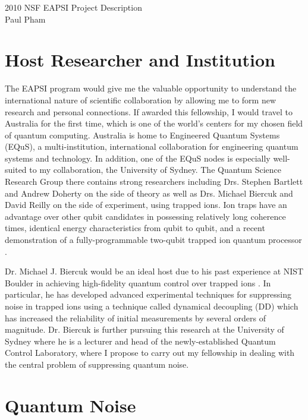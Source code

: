 \documentclass{article}
\begin{document}
\begin{center}
\LARGE{2010 NSF EAPSI Project Description}\\
\Large{Paul Pham}
\end{center}


\section{Host Researcher and Institution}

The EAPSI program would give me the valuable opportunity to understand the
international
nature of scientific collaboration by allowing me to form new research
and personal connections. If awarded this
fellowship, I would travel to Australia for the first time, which is one of
the world's centers for my chosen field of quantum computing. Australia is home
to Engineered Quantum Systems (EQuS), a multi-institution, international
collaboration for engineering quantum systems and technology.
In addition, one of the EQuS nodes is especially well-suited to my
collaboration, the University of Sydney.
The Quantum Science Research Group there contains strong researchers 
including Drs. Stephen Bartlett and Andrew Doherty on the
side of theory as well as Drs. Michael Biercuk and David Reilly on the side of
experiment, using trapped ions.
Ion traps have an advantage over
other qubit candidates in possessing relatively long coherence times,
identical energy characteristics from qubit to qubit, and a recent
demonstration of a fully-programmable two-qubit trapped ion quantum processor
 \cite{Hanneke2009}.

Dr. Michael J. Biercuk would be an ideal host due to his past experience at NIST
Boulder in achieving high-fidelity quantum control over trapped ions
\cite{BUVSIB2009a}.
In particular, he has developed advanced experimental techniques for 
suppressing noise in trapped ions using a technique called dynamical
decoupling (DD) which has increased the reliability of initial measurements
by several orders of magnitude.
Dr. Biercuk is further pursuing this research
at the University of Sydney where he is a lecturer and head of the newly-established
Quantum Control Laboratory, where I propose to carry out my fellowship in
dealing with the central problem of suppressing quantum noise.

\section{Quantum Noise}
\end{document}
